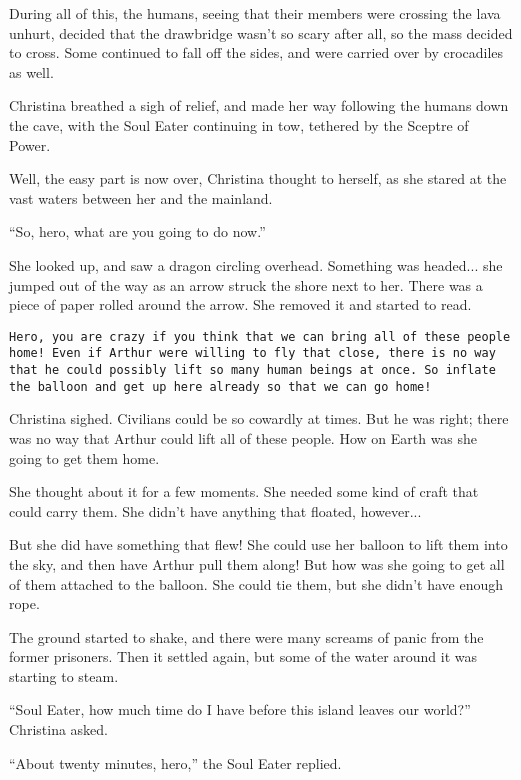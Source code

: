 \documentclass[showtrims,b6paper,draft,10pt]{memoir}
\begin{document}
During all of this, the humans, seeing that their members were crossing the lava unhurt, decided that the drawbridge wasn't so scary after all, so the mass decided to cross.  Some continued to fall off the sides, and were carried over by crocadiles as well.

Christina breathed a sigh of relief, and made her way following the humans down the cave, with the Soul Eater continuing in tow, tethered by the Sceptre of Power.

\timeskip
Well, the easy part is now over, Christina thought to herself, as she stared at the vast waters between her and the mainland.

``So, hero, what are you going to do now.''

She looked up, and saw a dragon circling overhead.  Something was headed... she jumped out of the way as an arrow struck the shore next to her.  There was a piece of paper rolled around the arrow.  She removed it and started to read.

\texttt{Hero, you are crazy if you think that we can bring all of these people home!  Even if Arthur were willing to fly that close, there is no way that he could possibly lift so many human beings at once.  So inflate the balloon and get up here already so that we can go home!}

Christina sighed.  Civilians could be so cowardly at times.  But he was right;  there was no way that Arthur could lift all of these people.  How on Earth was she going to get them home.

She thought about it for a few moments.  She needed some kind of craft that could carry them.  She didn't have anything that floated, however...

But she did have something that flew!  She could use her balloon to lift them into the sky, and then have Arthur pull them along!  But how was she going to get all of them attached to the balloon.  She could tie them, but she didn't have enough rope.

The ground started to shake, and there were many screams of panic from the former prisoners.  Then it settled again, but some of the water around it was starting to steam.

``Soul Eater, how much time do I have before this island leaves our world?''  Christina asked.

``About twenty minutes, hero,'' the Soul Eater replied.
\end{document}
